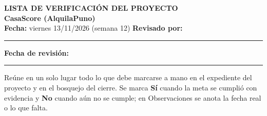\documentclass[11pt,a4paper]{article}
\begin{document}
\begin{center}
    {\Large \textbf{\textcolor{AzulUNA}{LISTA DE VERIFICACIÓN DEL PROYECTO}}}\\[3pt]
    {\normalsize \textbf{CasaScore (AlquilaPuno)}}\\[4pt]
    \footnotesize \textbf{Fecha:} viernes 13/11/2026 (semana 12) \quad \textbar\quad \textbf{Revisado por:} \rule{4.2cm}{0.4pt} \quad \textbar\quad \textbf{Fecha de revisión:} \rule{2.2cm}{0.4pt}
\end{center}

{\small\noindent Reúne en un solo lugar todo lo que debe marcarse a mano en el expediente del proyecto y en el bosquejo del cierre. Se marca \textbf{Sí} cuando la meta se cumplió con evidencia y \textbf{No} cuando aún no se cumple; en Observaciones se anota la fecha real o lo que falta.}


\end{document}
